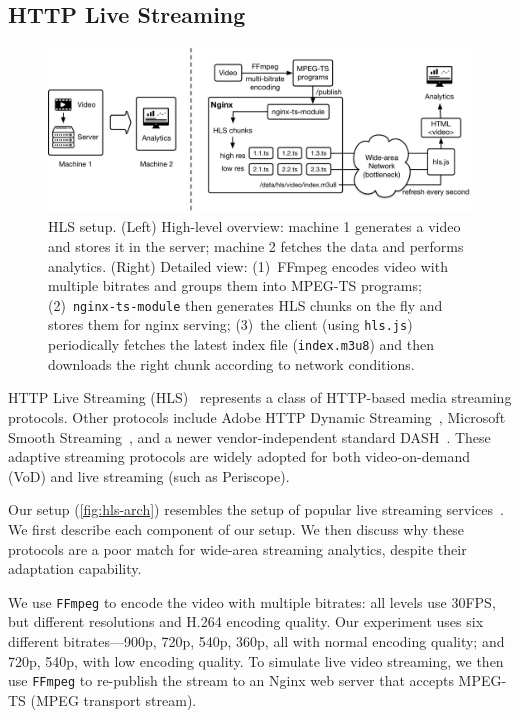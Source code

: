 \subsection{HTTP Live Streaming}
\label{sec:hls}

\begin{figure}[t]
  \centering
  \includegraphics[width=\textwidth]{figures/hls.pdf}
  \caption{HLS setup. (Left) High-level overview: machine 1 generates a video
    and stores it in the server; machine 2 fetches the data and performs
    analytics. (Right) Detailed view: (1)~FFmpeg encodes video with multiple
    bitrates and groups them into MPEG-TS programs; (2)~\texttt{nginx-ts-module}
    then generates HLS chunks on the fly and stores them for nginx serving;
    (3)~the client (using \texttt{hls.js}) periodically fetches the latest index
    file (\texttt{index.m3u8}) and then downloads the right chunk according to
    network conditions.}
  \label{fig:hls-arch}
\end{figure}

HTTP Live Streaming (HLS)~\cite{pantos2016http} represents a class of HTTP-based
media streaming protocols. Other protocols include Adobe HTTP Dynamic
Streaming~\cite{adobestreaming}, Microsoft Smooth
Streaming~\cite{zambelli2009iis}, and a newer vendor-independent standard
DASH~\cite{michalos2012dynamic, sodagar2011mpeg}. These adaptive streaming
protocols are widely adopted for both video-on-demand (VoD) and live streaming
(such as Periscope).

Our setup (\autoref{fig:hls-arch}) resembles the setup of popular live streaming
services~\cite{wang2016anatomy}. We first describe each component of our
setup. We then discuss why these protocols are a poor match for wide-area
streaming analytics, despite their adaptation capability.

 We use \texttt{FFmpeg} to encode the video with multiple bitrates:
all levels use 30FPS, but different resolutions and H.264 encoding quality. Our
experiment uses six different bitrates---900p, 720p, 540p, 360p, all with normal
encoding quality; and 720p, 540p, with low encoding quality. To simulate live
video streaming, we then use \texttt{FFmpeg} to re-publish the stream to an
Nginx web server that accepts MPEG-TS (MPEG transport stream).


